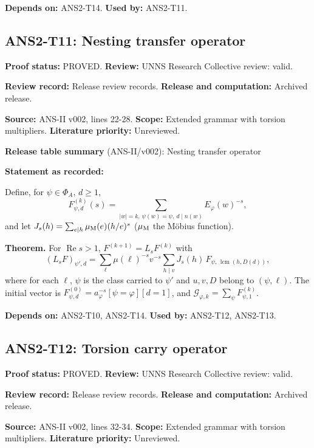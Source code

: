 \documentclass[
  11pt,
]{article}
\begin{document}
\textbf{Depends on:} ANS2-T14. \textbf{Used by:} ANS2-T11.

\hypertarget{ans2-t11-nesting-transfer-operator}{%
\subsection{ANS2-T11: Nesting transfer
operator}\label{ans2-t11-nesting-transfer-operator}}

\textbf{Proof status:} PROVED. \textbf{Review:} UNNS Research Collective
review: valid.

\textbf{Review record:} Release review records. \textbf{Release and
computation:} Archived release.

\textbf{Source:} ANS-II v002, lines 22-28. \textbf{Scope:} Extended
grammar with torsion multipliers. \textbf{Literature priority:}
Unreviewed.

\textbf{Release table summary} (ANS-II/v002): Nesting transfer operator

\textbf{Statement as recorded:}

Define, for \(\psi\in\Phi_A\), \(d\ge1\),
\[F^{(k)}_{\psi,d}(s)=\sum_{|w|=k,\ \psi(w)=\psi,\ d\mid n(w)}E_\varphi(w)^{-s},\]
and let \(J_s(h)=\sum_{e\mid h}\mu_{\rm M}(e)(h/e)^s\) (\(\mu_{\rm M}\)
the Möbius function).

\textbf{Theorem.} For \(\operatorname{Re}s>1\), \(F^{(k+1)}=L_sF^{(k)}\)
with
\[(L_sF)_{\psi',d}=\sum_{\ell}\mu(\ell)^{-s}v^{-s}\sum_{h\mid v}J_s(h)\,F_{\psi,\,\operatorname{lcm}(h,D(d))},\]
where for each \(\ell\), \(\psi\) is the class carried to \(\psi'\) and
\(u,v,D\) belong to \((\psi,\ell)\). The initial vector is
\(F^{(0)}_{\psi,d}=a_\varphi^{-s}[\psi=\varphi][d=1]\), and
\(\mathcal G_{\varphi,k}=\sum_\psi F^{(k)}_{\psi,1}\).

\textbf{Depends on:} ANS2-T10, ANS2-T14. \textbf{Used by:} ANS2-T12,
ANS2-T13.

\hypertarget{ans2-t12-torsion-carry-operator}{%
\subsection{ANS2-T12: Torsion carry
operator}\label{ans2-t12-torsion-carry-operator}}

\textbf{Proof status:} PROVED. \textbf{Review:} UNNS Research Collective
review: valid.

\textbf{Review record:} Release review records. \textbf{Release and
computation:} Archived release.

\textbf{Source:} ANS-II v002, lines 32-34. \textbf{Scope:} Extended
grammar with torsion multipliers. \textbf{Literature priority:}
Unreviewed.
\end{document}
